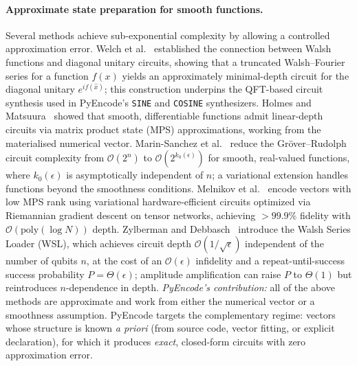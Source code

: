 \documentclass[10pt,twocolumn]{article}
\begin{document}
\paragraph{Approximate state preparation for smooth functions.}
Several methods achieve sub-exponential complexity by allowing a
controlled approximation error.
Welch et al.~\cite{welch2014} established the connection between Walsh
functions and diagonal unitary circuits, showing that a truncated
Walsh--Fourier series for a function $f(x)$ yields an
approximately minimal-depth circuit for the diagonal unitary
$e^{if(\hat{x})}$; this construction underpins the QFT-based circuit
synthesis used in PyEncode's \texttt{SINE} and \texttt{COSINE}
synthesizers.
Holmes and Matsuura~\cite{holmes2020} showed that smooth,
differentiable functions admit linear-depth circuits via matrix product
state (MPS) approximations, working from the materialised numerical
vector.
Marin-Sanchez et al.~\cite{marinsanchez2023} reduce the
Gr\"{o}ver--Rudolph circuit complexity from $\mathcal{O}(2^n)$ to
$\mathcal{O}(2^{k_0(\epsilon)})$ for smooth, real-valued functions,
where $k_0(\epsilon)$ is asymptotically independent of $n$; a
variational extension handles functions beyond the smoothness
conditions.
Melnikov et al.~\cite{melnikov2023quantum} encode vectors with low MPS rank
using variational hardware-efficient circuits optimized via Riemannian
gradient descent on tensor networks, achieving $>99.9\%$ fidelity with
$\mathcal{O}(\mathrm{poly}(\log N))$ depth.
Zylberman and Debbasch~\cite{zylberman2024walsh} introduce the Walsh
Series Loader (WSL), which achieves circuit depth
$\mathcal{O}(1/\sqrt{\epsilon})$ independent of the number of qubits
$n$, at the cost of an $\mathcal{O}(\epsilon)$ infidelity and a
repeat-until-success success probability $P = \Theta(\epsilon)$;
amplitude amplification can raise $P$ to $\Theta(1)$ but reintroduces
$n$-dependence in depth.
\emph{PyEncode's contribution:} all of the above methods are
approximate and work from either the numerical vector or a smoothness
assumption.  PyEncode targets the complementary regime: vectors whose
structure is known \emph{a priori} (from source code, vector fitting,
or explicit declaration), for which it produces \emph{exact},
closed-form circuits with zero approximation error.
\end{document}
